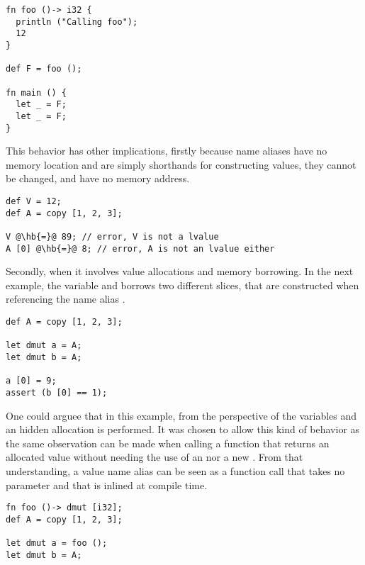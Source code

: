 \begin{lstlisting}[style=coloredverbatim]
fn foo ()-> i32 {
  println ("Calling foo");
  12
}

def F = foo ();

fn main () {
  let _ = F;
  let _ = F;
}
\end{lstlisting}


This behavior has other implications, firstly because name aliases have no
memory location and are simply shorthands for constructing values, they cannot
be changed, and have no memory address.

\begin{lstlisting}[style=coloredverbatim, escapechar=@]
def V = 12;
def A = copy [1, 2, 3];

V @\hb{=}@ 89; // error, V is not a lvalue
A [0] @\hb{=}@ 8; // error, A is not an lvalue either
\end{lstlisting}

Secondly, when it involves value allocations and memory borrowing. In the next
example, the variable  and  borrows two different slices, that
are constructed when referencing the name alias .

\begin{lstlisting}[style=coloredverbatim]
def A = copy [1, 2, 3];

let dmut a = A;
let dmut b = A;

a [0] = 9;
assert (b [0] == 1);
\end{lstlisting}

One could arguee that in this example, from the perspective of the variables
 and  an hidden allocation is performed. It was chosen to
allow this kind of behavior as the same observation can be made when calling a
function that returns an allocated value without needing the use of an
 nor a new . From that understanding, a value name
alias can be seen as a function call that takes no parameter and that is inlined
at compile time.

\begin{lstlisting}[style=coloredverbatim]
fn foo ()-> dmut [i32];
def A = copy [1, 2, 3];

let dmut a = foo ();
let dmut b = A;
\end{lstlisting}

\vfill%
\pagebreak
